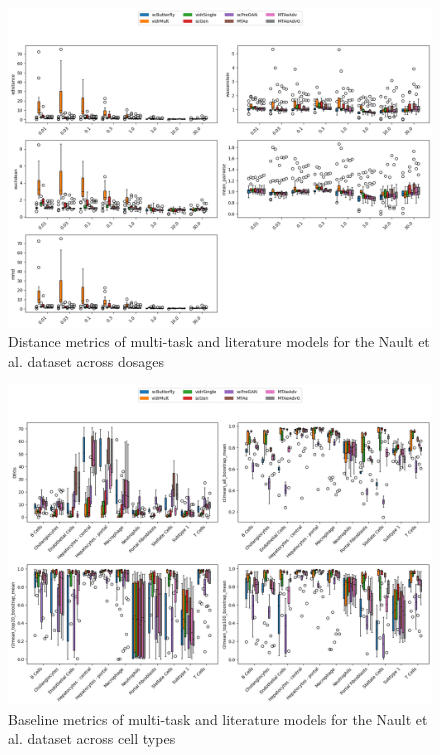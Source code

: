 \documentclass[12pt, a4paper]{article}
\begin{document}
\begin{figure}[h!]
    \centering
    \includegraphics[width=.85\textwidth]{selected_benchmarking_doses_distance_metrics_nault.png}
    \caption{Distance metrics of multi-task and literature models for the Nault et al. \cite{nault2021single,nault2022benchmarking} dataset across dosages}
    \label{fig:selected_nault_doses_distance}
\end{figure}


\begin{figure}[h!]
    \centering
    \includegraphics[width=.85\textwidth]{selected_benchmarking_cell_type_baseline_metrics_nault.png}
    \caption{Baseline metrics of multi-task and literature models for the Nault et al. \cite{nault2021single,nault2022benchmarking} dataset across cell types}
    \label{fig:selected_nault_cell_type_baseline}
\end{figure}
\end{document}
